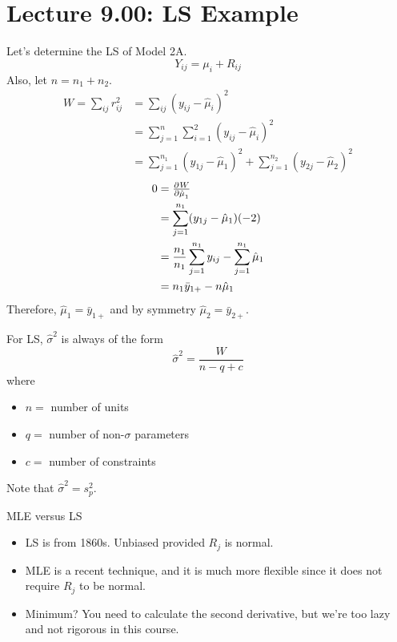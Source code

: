 \section{Lecture 9.00: LS Example}
Let's determine the LS of Model 2A.
\[ Y_{ij}=\mu_i+R_{ij} \]
Also, let $ n=n_1+n_2 $.
\begin{align*}
    W=\sum_{ij}r_{ij}^2
     & =\sum_{ij}(y_{ij}-\hat{\mu}_i)^2                                                  \\
     & =\sum_{j=1}^{n} \sum_{i=1}^{2} (y_{ij}-\hat{\mu}_i)^2                             \\
     & =\sum_{j=1}^{n_1}(y_{1j}-\hat{\mu}_1)^2 + \sum_{j=1}^{n_2} (y_{2j}-\hat{\mu}_2)^2
\end{align*}
\begin{align*}
    0 & =\pd{W}{\hat{\mu}_1}                                                 \\
      & =\sum_{j=1}^{n_1} (y_{1j}-\hat{\mu}_1)(-2)                           \\
      & =\frac{n_1}{n_1} \sum_{j=1}^{n_1} y_{ij}-\sum_{j=1}^{n_1}\hat{\mu}_1 \\
      & =n_1\bar{y}_{1+}-n\hat{\mu}_1                                        \\
\end{align*}
Therefore, $ \hat{\mu}_1=\bar{y}_{1+} $ and by symmetry $ \hat{\mu}_2=\bar{y}_{2+} $.
\begin{Remark}{}{}
    For LS, $ \hat{\sigma}^2 $ is always of the form
    \[ \hat{\sigma}^2=\frac{W}{n-q+c} \]
    where
    \begin{itemize}
        \item $ n= $ number of units
        \item $ q= $ number of non-$ \sigma $ parameters
        \item $ c= $ number of constraints
    \end{itemize}
    Note that $ \hat{\sigma}^2=s_p^2 $.
\end{Remark}
\begin{Remark}{MLE versus LS}{}
    \begin{itemize}
        \item LS is from 1860s. Unbiased provided $ R_j $ is normal.
        \item MLE is a recent technique, and it is much more flexible
              since it does not require $ R_j $ to be normal.
        \item Minimum? You need to calculate the second derivative,
              but we're too lazy and not rigorous in this course.
    \end{itemize}
\end{Remark}

